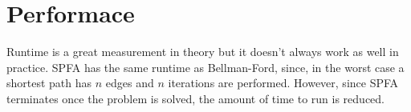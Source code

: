 \documentclass[]{article}
\begin{document}
\section{Performace}
Runtime is a great measurement in theory but it doesn't always work as well in practice. SPFA has the same runtime as Bellman-Ford, since, in the worst case a shortest path has $n$ edges and $n$ iterations are performed. However, since SPFA terminates once the problem is solved, the amount of time to run is reduced.
 
\end{document}
